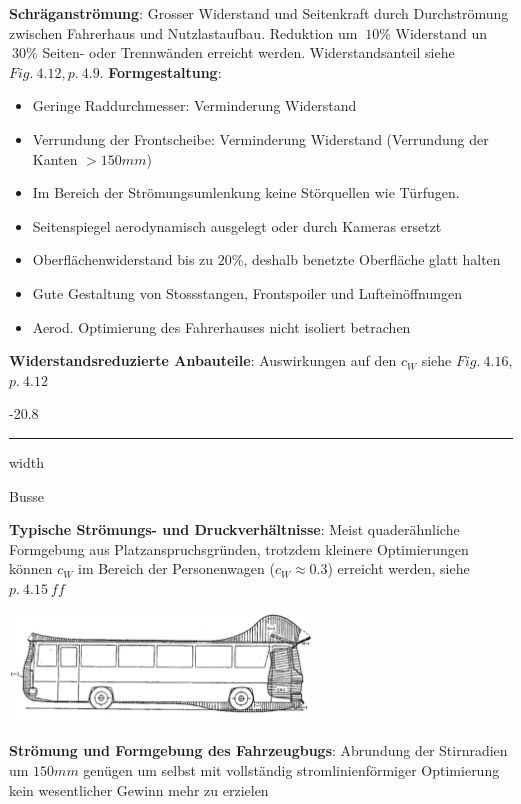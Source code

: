 \documentclass[8pt, landscape, fleqn]{scrartcl}
\makeatletter
\renewcommand{\subsubsection}{\@startsection{subsubsection}{1}{0mm}%
{-2\baselineskip}{0.8\baselineskip}%
{\hrule depth 0.2pt width\columnwidth\vspace*{1.2em}\normalsize\bfseries\rmfamily}}
\makeatother
\begin{document}
\begin{multicols*}{3}
\textbf{Schräganströmung}: Grosser Widerstand und Seitenkraft durch Durchströmung zwischen Fahrerhaus und Nutzlastaufbau. Reduktion um $~10\%$ Widerstand un $~30\%$ Seiten- oder Trennwänden erreicht werden. Widerstandsanteil siehe $Fig.~4.12, p.~4.9$. \newline \newline
\textbf{Formgestaltung}: 
\begin{itemize}
    \item Geringe Raddurchmesser: Verminderung Widerstand
    \item Verrundung der Frontscheibe: Verminderung Widerstand (Verrundung der Kanten $> 150 mm$)
    \item Im Bereich der Strömungsumlenkung keine Störquellen wie Türfugen. 
    \item Seitenspiegel aerodynamisch ausgelegt oder durch Kameras ersetzt 
    \item Oberflächenwiderstand bis zu $20\%$, deshalb benetzte Oberfläche glatt halten
    \item Gute Gestaltung von Stossstangen, Frontspoiler und Lufteinöffnungen
    \item Aerod. Optimierung des Fahrerhauses nicht isoliert betrachen 
\end{itemize}

\textbf{Widerstandsreduzierte Anbauteile}: Auswirkungen auf den $c_W$ siehe $Fig.~4.16$, $p.~4.12$

\subsubsection{Busse}

\textbf{Typische Strömungs- und Druckverhältnisse}: Meist quaderähnliche Formgebung aus Platzanspruchsgründen, trotzdem kleinere Optimierungen können $c_W$ im Bereich der Personenwagen ($c_W \approx 0.3$) erreicht werden, siehe $p.~4.15~ff$ 

\begin{center}
    \includegraphics[width=8cm]{Druck_Bus_Ohne_Aerodyn.png}
\end{center}

\textbf{Strömung und Formgebung des Fahrzeugbugs}: Abrundung der Stirnradien um $150mm$ genügen um selbst mit vollständig stromlinienförmiger Optimierung kein wesentlicher Gewinn mehr zu erzielen


\end{multicols*}
\end{document}
